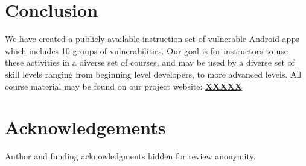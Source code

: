 \documentclass{sig-alternate-05-2015}
\newif\ifisnopii
\begin{document}
\section{Conclusion}
\label{sec: conclusion}

We have created a publicly available instruction set of vulnerable Android apps which includes 10 groups of vulnerabilities. Our goal is for instructors to use these activities in a diverse set of courses, and may be used by a diverse set of skill levels ranging from beginning level developers, to more advanced levels. All course material may be found on our project website: \textbf{\url{XXXXX}}


\section*{Acknowledgements}
\ifisnopii %
This work is partially sponsored by a SIGCSE Special Projects Grant. %

\else %
Author and funding acknowledgments hidden for review anonymity.
\fi %

\balance 





\end{document}

